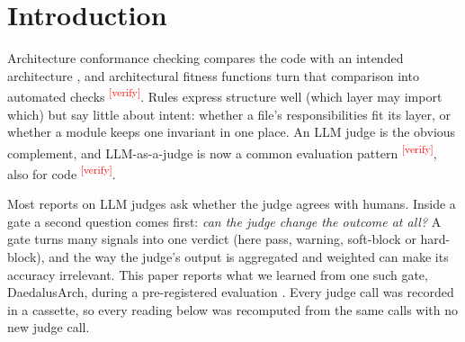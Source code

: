 \documentclass[10pt,a4paper]{article}
\newcommand{\citeneeded}[1]{\cite{#1}\textsuperscript{\textcolor{red}{\tiny[verify]}}}
\newcommand{\tool}{DaedalusArch}
\begin{document}

\section{Introduction}\label{sec:intro}

Architecture conformance checking compares the code with an intended architecture
\cite{murphy1995reflexion}, and architectural fitness functions turn that comparison into automated checks
\citeneeded{ford2017evolutionary}. Rules express structure well (which layer may import which) but say little about
intent: whether a file's responsibilities fit its layer, or whether a module keeps one invariant in one place. An
LLM judge is the obvious complement, and LLM-as-a-judge is now a common evaluation pattern
\cite{zheng2023judging}\citeneeded{liu2023geval,gu2024survey}, also for code \citeneeded{zhuo2024icescore}.

Most reports on LLM judges ask whether the judge agrees with humans. Inside a gate a second question comes first:
\emph{can the judge change the outcome at all?} A gate turns many signals into one verdict (here pass, warning,
soft-block or hard-block), and the way the judge's output is aggregated and weighted can make its accuracy
irrelevant. This paper reports what we learned from one such gate, \tool{}, during a pre-registered evaluation
\cite{nosek2018prereg}. Every judge call was recorded in a cassette, so every reading below was recomputed from
the same calls with no new judge call.
\end{document}
